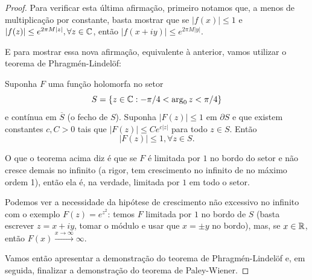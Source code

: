 \begin{proof}
            Para verificar esta última afirmação, primeiro notamos que,
            a menos de multiplicação por constante, basta mostrar que se
            $|f(x)| \leq 1$ e $|f(z)| \leq e^{2\pi M|z|}, \forall z\in\mathbb{C}$,
            então $|f(x+iy)| \leq e^{2\pi M|y|}$.
            
            E para mostrar essa nova afirmação, equivalente à anterior,
            vamos utilizar o teorema de Phragmén-Lindelöf:
            \begin{teorema}
                Suponha $F$ uma função holomorfa no setor
                \begin{equation*}
                    S = \{ z\in\mathbb{C} : -\pi/4 < \arg_0 z < \pi/4 \}
                \end{equation*}
                e contínua em $\overline{S}$ (o fecho de $S$). Suponha
                $|F(z)| \leq 1$ em $\partial S$ e que existem constantes
                $c,C>0$ tais que $|F(z)| \leq Ce^{c|z|}$ para todo $z\in S$.
                Então
                \begin{equation*}
                    |F(z)| \leq 1, \forall z\in S.
                \end{equation*}
            \end{teorema}
            O que o teorema acima diz é que se $F$ é limitada por $1$ no
            bordo do setor e não cresce demais no infinito (a rigor, tem
            crescimento no infinito de no máximo ordem 1), então ela é,
            na verdade, limitada por $1$ em todo o setor.
            
            Podemos ver a necessidade da hipótese de crescimento não
            excessivo no infinito com o exemplo $F(z) = e^{z^2}$:
            temos $F$ limitada por $1$ no bordo de $S$ (basta escrever
            $z = x+iy$, tomar o módulo e usar que $x=\pm y$ no bordo),
            mas, se $x\in\mathbb{R}$, então $F(x)\xrightarrow{x\to\infty} \infty$.
            
            Vamos então apresentar a demonstração do teorema de
            Phragmén-Lindelöf e, em seguida, finalizar a demonstração do
            teorema de Paley-Wiener.
            

\end{proof}
